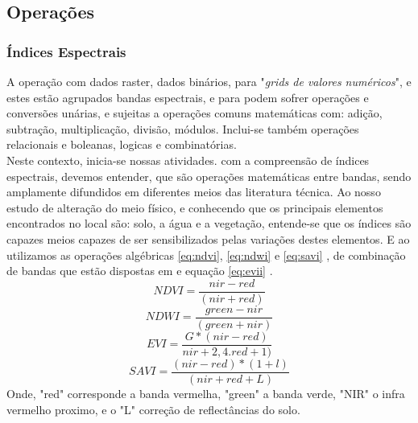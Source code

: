 		\subsection{Operações}  
		\subsubsection{Índices Espectrais}
		\hspace*{1.25 cm} A operação com dados raster, dados binários, para \cite[106]{Dormam} "\textit{grids de valores numéricos}", e estes estão agrupados bandas espectrais, e para \cite[p.178 e p.181]{Liu}  podem sofrer operações e conversões unárias, e sujeitas a operações comuns matemáticas com: adição, subtração, multiplicação, divisão, módulos. Inclui-se também operações relacionais e boleanas, logicas e combinatórias.  \\
		\hspace*{1.25 cm}  Neste contexto, inicia-se nossas atividades. com a compreensão de índices espectrais, devemos entender, que são operações matemáticas entre bandas, sendo amplamente difundidos em diferentes meios das literatura técnica. Ao nosso estudo de alteração do meio físico, e conhecendo que os principais elementos encontrados no local são: solo, a água e a vegetação, entende-se  que  os índices  são capazes meios capazes de ser sensibilizados pelas variações destes elementos. E ao utilizamos as operações algébricas  \eqref{eq:ndvi}, \eqref{eq:ndwi} e \eqref{eq:savi} , de combinação de bandas que estão dispostas em \cite[p.165]{Thekapbail} e equação  \eqref{eq:evii} \cite[p.7]{Thekapbail}. 
		\begin{equation} \label{eq:ndvi}
			NDVI = \dfrac{nir - red}{ (nir + red) }
		\end{equation}
		\begin{equation}\label{eq:ndwi}
			NDWI = \dfrac{green - nir}{ (green + nir) }
		\end{equation}
		\begin{equation}\label{eq:evii}
			EVI = \dfrac{G*(nir - red)}{ nir + 2,4. red +1) }
		\end{equation}
		\begin{equation}\label{eq:savi}
			SAVI = \dfrac{(nir - red)*(1 +l)}{ (nir + red +L) }
		\end{equation}
		\hspace*{1.25 cm} Onde, "red" corresponde a banda vermelha, "green" a banda verde, "NIR" o infra vermelho proximo, e o "L" correção de reflectâncias do solo.\\
